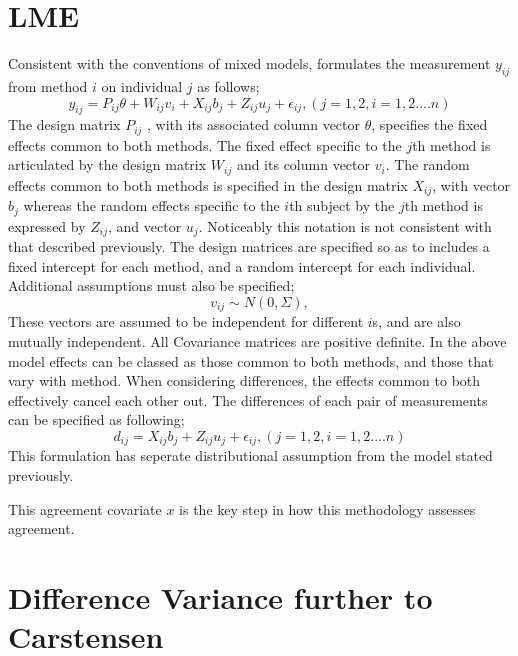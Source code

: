 \documentclass[12pt, a4paper]{report}
\theoremstyle{plain}
\theoremstyle{definition}
\theoremstyle{remark}
\begin{document}
\section{LME}
Consistent with the conventions of mixed models, \citet{pkc}
formulates the measurement $y_{ij} $from method $i$ on individual
$j$ as follows;
\begin{equation}
y_{ij} =P_{ij}\theta + W_{ij}v_{i} + X_{ij}b_{j} + Z_{ij}u_{j} +
\epsilon_{ij},     (j=1,2, i=1,2....n)
\end{equation}
The design matrix $P_{ij}$ , with its associated column vector
$\theta$, specifies the fixed effects common to both methods. The
fixed effect specific to the $j$th method is articulated by the
design matrix $W_{ij}$ and its column vector $v_{i}$. The random
effects common to both methods is specified in the design matrix
$X_{ij}$, with vector $b_{j}$ whereas the random effects specific
to the $i$th subject by the $j$th method is expressed by $Z_{ij}$,
and vector $u_{j}$. Noticeably this notation is not consistent
with that described previously.  The design matrices are specified
so as to includes a fixed intercept for each method, and a random
intercept for each individual. Additional assumptions must also be
specified;
\begin{equation}
v_{ij} \sim N(0,\Sigma),
\end{equation}
These vectors are assumed to be independent for different $i$s,
and are also mutually independent. All Covariance matrices are
positive definite.  In the above model effects can be classed as
those common to both methods, and those that vary with method.
When considering differences, the effects common to both
effectively cancel each other out. The differences of each pair of
measurements can be specified as following;
\begin{equation}
d_{ij} = X_{ij}b_{j} + Z_{ij}u_{j} + \epsilon_{ij},     (j=1,2,
i=1,2....n)
\end{equation}
This formulation has seperate distributional assumption from the
model stated previously.

This agreement covariate $x$ is the key step in how this
methodology assesses agreement.


\section{Difference Variance further to Carstensen}
\end{document}
